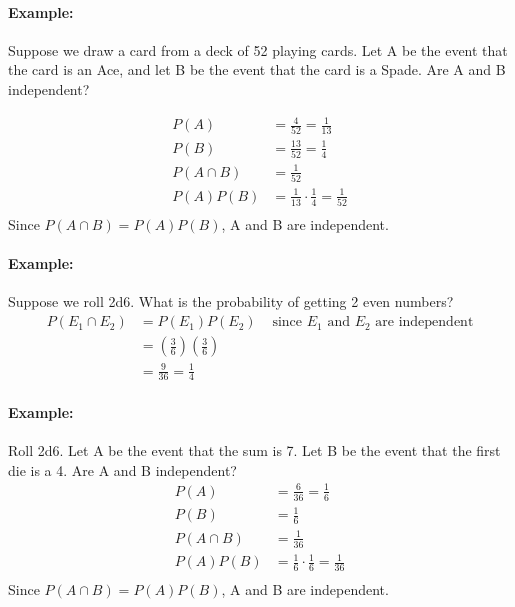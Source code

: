 \paragraph*{Example:}
Suppose we draw a card from a deck of 52 playing cards. Let A be the event that the card is an Ace, and let B be the event that 
the card is a Spade. Are A and B independent?

\begin{align*}
    P(A) &= \frac{4}{52} = \frac{1}{13} \\
    P(B) &= \frac{13}{52} = \frac{1}{4} \\
    P(A \cap B) &= \frac{1}{52} \\
    P(A)P(B) &= \frac{1}{13} \cdot \frac{1}{4} = \frac{1}{52} \\
\end{align*}
Since $P(A \cap B) = P(A)P(B)$, A and B are independent.

\paragraph*{Example:}
Suppose we roll 2d6. What is the probability of getting 2 even numbers?
\begin{align*}
    P(E_1  \cap E_2) &= P(E_1)P(E_2) &\text{ since } E_1 \text{ and } E_2 \text{ are independent} \\
    &= \left(\frac{3}{6}\right)\left(\frac{3}{6}\right) \\
    &= \frac{9}{36} = \frac{1}{4}
\end{align*}

\paragraph*{Example:}
Roll 2d6. Let A be the event that the sum is 7. Let B be the event that the first die is a 4. Are A and B independent?
\begin{align*}
    P(A) &= \frac{6}{36} = \frac{1}{6} \\
    P(B) &= \frac{1}{6} \\
    P(A \cap B) &= \frac{1}{36} \\
    P(A)P(B) &= \frac{1}{6} \cdot \frac{1}{6} = \frac{1}{36} \\
\end{align*}
Since $P(A \cap B) = P(A)P(B)$, A and B are independent.